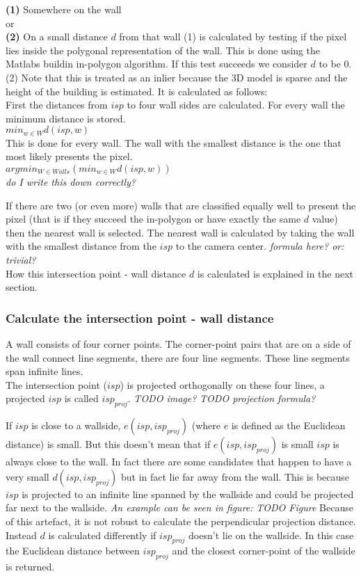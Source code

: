 \documentclass[10pt]{article}
\begin{document}
\textbf{(1)} Somewhere on the wall 
\\
or
\\
\textbf{(2)} On a small distance $d$ from that wall
(1) is calculated by testing if the pixel lies inside the polygonal
representation of the wall. This is done using the Matlabs buildin in-polygon
algorithm. If this test succeeds we consider $d$ to be 0.\\

(2) Note that this is treated as an inlier because the 3D model is sparse and the height of
the building is estimated. It is calculated as follows: \\
First the distances from $isp$ to four wall sides are calculated.
For every wall the minimum distance is stored.\\
$min_{w\in W} d(isp, w)$\\
This is done for every wall. The wall with the smallest distance is the one that most likely presents the pixel.\\
$arg min_{W \in Walls} ( min_{w\in W} d(isp, w) )$\\
\textit{ do I write this down correctly?}


If there are two (or even more) walls that are classified equally well to
present the pixel (that is if they succeed the in-polygon or have exactly the
same $d$ value) then the nearest wall is selected. The nearest wall is
calculated by taking the wall with the smallest distance from the $isp$ to the
camera center.
\textit{ formula here? or: trivial?}\\
How this intersection point - wall distance $d$ is calculated is explained in
the next section.

\subsubsection{Calculate the intersection point - wall distance}
A wall consists of four corner points. The corner-point pairs that are on a
side of the wall connect line segments, there are four line segments. These
line segments span infinite lines.\\

The intersection point ($isp$) is projected orthogonally on these four lines, a
projected $isp$ is called $isp_{proj}$.
\textit{ TODO image?}
\textit{ TODO projection formula?}

If $isp$ is close to a wallside, $e(isp, isp_{proj})$ (where $e$ is defined as
the Euclidean distance) is small.  But this doesn't mean that if
$e(isp,isp_{proj})$ is small $isp$ is always close to the wall. In fact there are
some candidates that happen to have a very small $d(isp, isp_{proj})$ but in fact
lie far away from the wall. This is because $isp$ is projected to an infinite
line spanned by the wallside and could be projected far next to the wallside.
\textit{ An example can be seen in figure:}
\textit{ TODO Figure}
Because of this artefact, it is not robust to calculate the perpendicular
projection distance.  Instead $d$ is calculated differently if $isp_{proj}$
doesn't lie on the wallside.  In this case the Euclidean distance between
$isp_{proj}$ and the closest corner-point of the wallside is returned.
\end{document}
